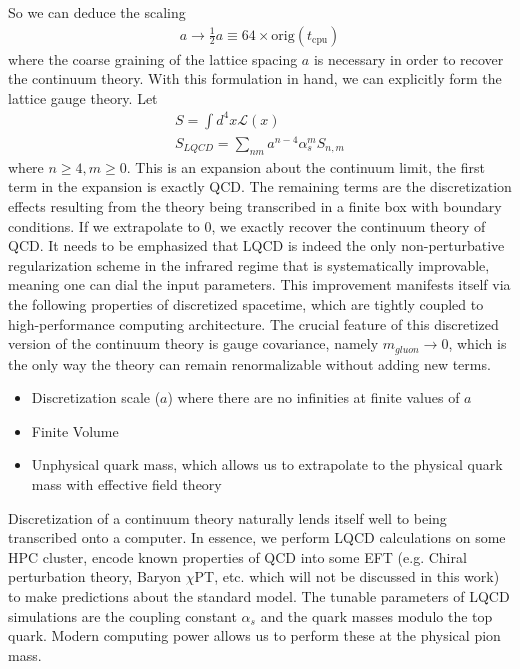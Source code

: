So we can deduce the scaling 
\begin{align}
    a \rightarrow \frac{1}{2}a \equiv 64 \times \text{orig}(t_{\text{cpu}})
\end{align} 
where the coarse graining of the lattice spacing $a$ is necessary in order to recover the continuum theory. With this formulation in hand, we can explicitly form the lattice gauge theory. 
Let 
\begin{align}
    S = \int d^4x \mathcal{L}(x) \\
    S_{LQCD} = \sum_{nm}^{} a^{n-4}\alpha_s^m S_{n,m} 
\end{align} where $n\geq4,m\geq0$. This is an expansion about the continuum limit, the first term in the expansion is exactly QCD. The remaining terms are the discretization effects resulting from the theory being transcribed in a finite box with boundary conditions. If we extrapolate to 0, we exactly recover the continuum theory of QCD. 
It needs to be emphasized that LQCD is indeed the only non-perturbative regularization scheme in the infrared regime that is systematically improvable, meaning one can dial the input parameters. This improvement manifests itself via the following properties of discretized spacetime, which are tightly coupled to high-performance computing architecture. The crucial feature of this discretized version of the continuum theory is gauge covariance, namely $m_{gluon} \rightarrow 0$, which is the only way the theory can remain renormalizable without adding new terms.  
\begin{itemize}
    \item Discretization scale ($a$) where there are no infinities at finite values of $a$
    \item Finite Volume 
    \item Unphysical quark mass, which allows us to extrapolate to the physical quark mass with effective field theory 
\end{itemize}


Discretization of a continuum theory naturally lends itself well to being transcribed onto a computer. In essence, we perform LQCD calculations on some HPC cluster, encode known properties of QCD into some EFT (e.g. Chiral perturbation theory, Baryon $\chi$PT, etc. which will not be discussed in this work) to make predictions about the standard model. The tunable parameters of LQCD simulations are the coupling constant $\alpha_s$ and the quark masses modulo the top quark.  Modern computing power allows us to perform these at the physical pion mass. 
